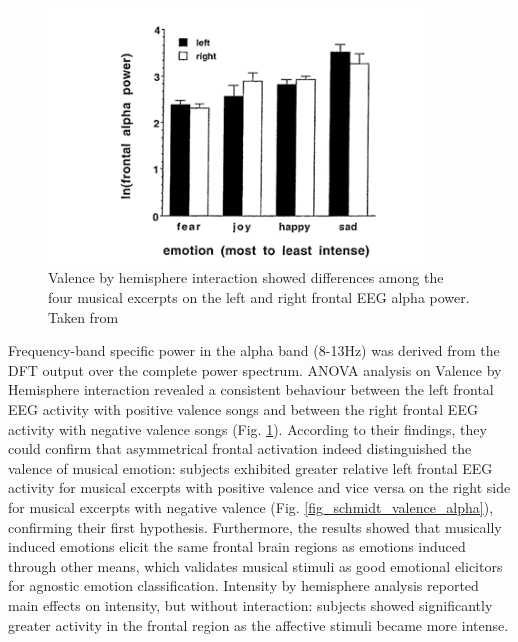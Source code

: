 \begin{figure}[h!]
\includegraphics[width=10cm]{img/related_work/valence_hemisphere.png}
\centering
\caption{Valence by hemisphere interaction showed differences among the four musical excerpts on the left and right frontal EEG alpha power. Taken from \cite{schmidt_frontal_2001}}\label{fig_schmidt_valence_emo}
\end{figure}
Frequency-band specific power in the alpha band (8-13Hz) was derived from the \ac{DFT} output over the complete power spectrum. ANOVA analysis on Valence by Hemisphere interaction revealed a consistent behaviour between the left frontal EEG activity with positive valence songs and between the right frontal \ac{EEG} activity with negative valence songs (Fig. \ref{fig_schmidt_valence_emo}).
According to their findings, they could confirm that asymmetrical frontal activation indeed distinguished the valence of musical emotion: subjects exhibited greater relative left frontal EEG activity for musical excerpts with positive valence and vice versa on the right side for musical excerpts with negative valence (Fig. \ref{fig_schmidt_valence_alpha}), confirming their first hypothesis. Furthermore, the results showed that musically induced emotions elicit the same frontal brain regions as emotions induced through other means, which validates musical stimuli as good emotional elicitors for agnostic emotion classification. Intensity by hemisphere analysis reported main effects on intensity, but without interaction: subjects showed significantly greater activity in the frontal region as the affective stimuli became more intense. 

